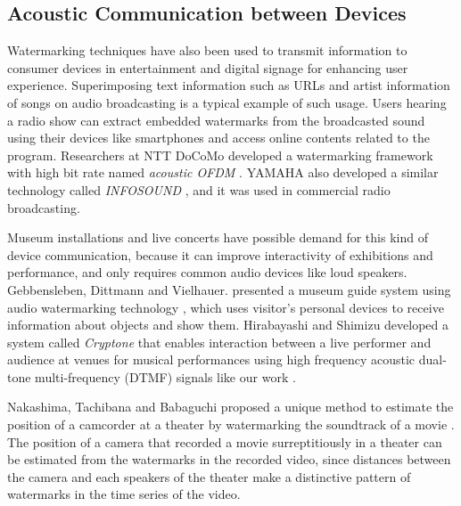 \subsection{Acoustic Communication between Devices}
Watermarking techniques have also been used to transmit information to consumer devices in entertainment and digital signage for enhancing user experience.
Superimposing text information such as URLs and artist information of songs on audio broadcasting is a typical example of such usage.
Users hearing a radio show can extract embedded watermarks from the broadcasted sound using their devices like smartphones and access online contents related to the program.
Researchers at NTT DoCoMo developed a watermarking framework with high bit rate named {\it acoustic OFDM} \cite{matsuoka2008acoustic}. YAMAHA also developed a similar technology called {\it INFOSOUND} \cite{infosound}, and it was used in commercial radio broadcasting.

Museum installations and live concerts have possible demand for this kind of device communication, because it can improve interactivity of exhibitions and performance, and only requires common audio devices like loud speakers.
Gebbensleben, Dittmann and Vielhauer. presented a museum guide system using audio watermarking technology \cite{gebbensleben2006multimodal}, which uses visitor's personal devices to receive information about objects and show them.
Hirabayashi and Shimizu developed a system called {\it Cryptone} that enables interaction between a live performer and audience at venues for musical performances using high frequency acoustic dual-tone multi-frequency (DTMF) signals like our work \cite{Hirabayashi:2012:CIP:2407707.2407712}.

Nakashima, Tachibana and Babaguchi proposed a unique method to estimate the position of a camcorder at a theater by watermarking the soundtrack of a movie \cite{nakashima2009watermarked}.
The position of a camera that recorded a movie surreptitiously in a theater can be estimated from the watermarks in the recorded video, since distances between the camera and each speakers of the theater make a distinctive pattern of watermarks in the time series of the video.

